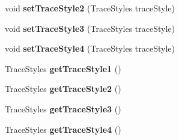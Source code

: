 \begin{DoxyCompactItemize}
\item 
\hypertarget{classQEPlot_a858b619f1d9562eb7cc4742e91ce3f03}{
void {\bfseries setTraceStyle2} (TraceStyles traceStyle)}
\label{classQEPlot_a858b619f1d9562eb7cc4742e91ce3f03}

\item 
\hypertarget{classQEPlot_a0ac3e6b75b0ae15c8b05add5f8701a70}{
void {\bfseries setTraceStyle3} (TraceStyles traceStyle)}
\label{classQEPlot_a0ac3e6b75b0ae15c8b05add5f8701a70}

\item 
\hypertarget{classQEPlot_a03efe229509fc25b271c7e1902c4b1d0}{
void {\bfseries setTraceStyle4} (TraceStyles traceStyle)}
\label{classQEPlot_a03efe229509fc25b271c7e1902c4b1d0}

\item 
\hypertarget{classQEPlot_adf8c26e83ac90cccecc400951937bc8c}{
TraceStyles {\bfseries getTraceStyle1} ()}
\label{classQEPlot_adf8c26e83ac90cccecc400951937bc8c}

\item 
\hypertarget{classQEPlot_a64e60b9d675e201cf6810862375909cb}{
TraceStyles {\bfseries getTraceStyle2} ()}
\label{classQEPlot_a64e60b9d675e201cf6810862375909cb}

\item 
\hypertarget{classQEPlot_a28c9e877b380482ed1ecc652409e256e}{
TraceStyles {\bfseries getTraceStyle3} ()}
\label{classQEPlot_a28c9e877b380482ed1ecc652409e256e}

\item 
\hypertarget{classQEPlot_a794a2ba8688b3411b2d17153804b87b1}{
TraceStyles {\bfseries getTraceStyle4} ()}
\label{classQEPlot_a794a2ba8688b3411b2d17153804b87b1}

\end{DoxyCompactItemize}
